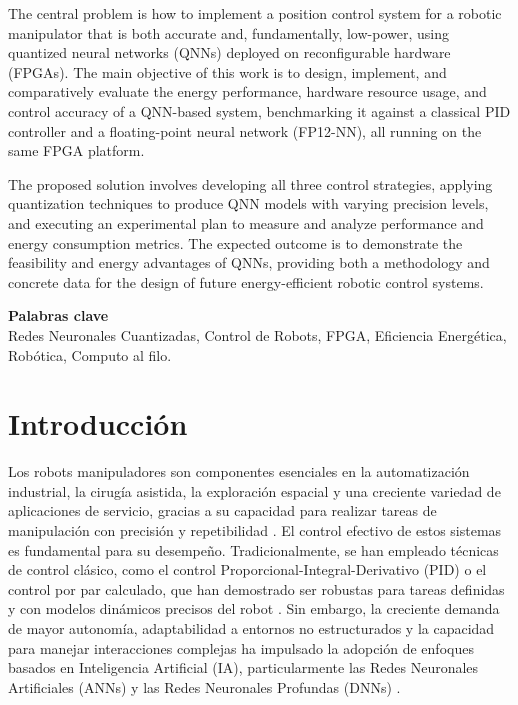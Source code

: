 \documentclass[12pt]{article}
\begin{document}
The central problem is how to implement a position control system for a robotic manipulator that is both accurate and, fundamentally, low-power, using quantized neural networks (QNNs) deployed on reconfigurable hardware (FPGAs). The main objective of this work is to design, implement, and comparatively evaluate the energy performance, hardware resource usage, and control accuracy of a QNN-based system, benchmarking it against a classical PID controller and a floating-point neural network (FP12-NN), all running on the same FPGA platform.

The proposed solution involves developing all three control strategies, applying quantization techniques to produce QNN models with varying precision levels, and executing an experimental plan to measure and analyze performance and energy consumption metrics. The expected outcome is to demonstrate the feasibility and energy advantages of QNNs, providing both a methodology and concrete data for the design of future energy-efficient robotic control systems.

\vspace{1.5cm}
{\large \textbf{Palabras clave}}\\ 

Redes Neuronales Cuantizadas, Control de Robots, FPGA, Eficiencia Energética, Robótica, Computo al filo.

\newpage
\tableofcontents %

\newpage
\section{Introducción}
\label{sec:introduccion}

Los robots manipuladores son componentes esenciales en la automatización industrial, la cirugía asistida, la exploración espacial y una creciente variedad de aplicaciones de servicio, gracias a su capacidad para realizar tareas de manipulación con precisión y repetibilidad \cite{modern_robotics}. El control efectivo de estos sistemas es fundamental para su desempeño. Tradicionalmente, se han empleado técnicas de control clásico, como el control Proporcional-Integral-Derivativo (PID) o el control por par calculado, que han demostrado ser robustas para tareas definidas y con modelos dinámicos precisos del robot \cite{modern_robotics}. Sin embargo, la creciente demanda de mayor autonomía, adaptabilidad a entornos no estructurados y la capacidad para manejar interacciones complejas ha impulsado la adopción de enfoques basados en Inteligencia Artificial (IA), particularmente las Redes Neuronales Artificiales (ANNs) y las Redes Neuronales Profundas (DNNs) \cite{JuarezLora2024Thesis, Park2025electronics}.
\end{document}
